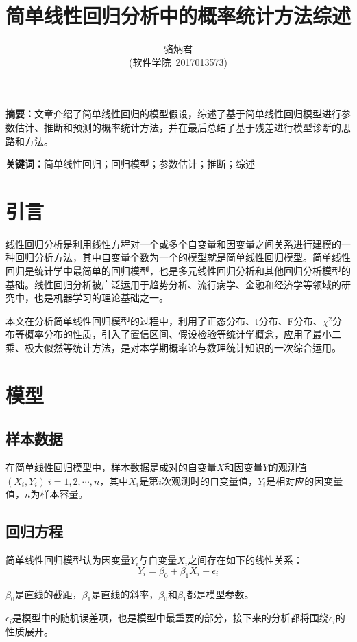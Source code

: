 \documentclass[UTF8]{ctexart}
\title{简单线性回归分析中的概率统计方法综述}
\author{骆炳君\\
    (软件学院\  2017013573)}
\begin{document}
\maketitle
{}

\textbf{摘要：}文章介绍了简单线性回归的模型假设，综述了基于简单线性回归模型进行参数估计、推断和预测的概率统计方法，并在最后总结了基于残差进行模型诊断的思路和方法。

\textbf{关键词：}简单线性回归；回归模型；参数估计；推断；综述

\section{引言}
线性回归分析是利用线性方程对一个或多个自变量和因变量之间关系进行建模的一种回归分析方法，其中自变量个数为一个的模型就是简单线性回归模型。简单线性回归是统计学中最简单的回归模型，也是多元线性回归分析和其他回归分析模型的基础。线性回归分析被广泛运用于趋势分析、流行病学、金融和经济学等领域的研究中，也是机器学习的理论基础之一。

本文在分析简单线性回归模型的过程中，利用了正态分布、t分布、F分布、$\chi^2$分布等概率分布的性质，引入了置信区间、假设检验等统计学概念，应用了最小二乘、极大似然等统计方法，是对本学期概率论与数理统计知识的一次综合运用。

\section{模型}
\subsection{样本数据}
在简单线性回归模型中，样本数据是成对的自变量$X$和因变量$Y$的观测值$(X_i,Y_i)\ i=1,2,\cdots,n$，其中$X_i$是第$i$次观测时的自变量值，$Y_i$是相对应的因变量值，$n$为样本容量。

\subsection{回归方程}
简单线性回归模型认为因变量$Y_i$与自变量$X_i$之间存在如下的线性关系：
\begin{equation}
    Y_i=\beta_0+\beta_1X_i+\epsilon_i
\end{equation}

$\beta_0$是直线的截距，$\beta_1$是直线的斜率，$\beta_0$和$\beta_1$都是模型参数。

$\epsilon_i$是模型中的随机误差项，也是模型中最重要的部分，接下来的分析都将围绕$\epsilon_i$的性质展开。
\end{document}
